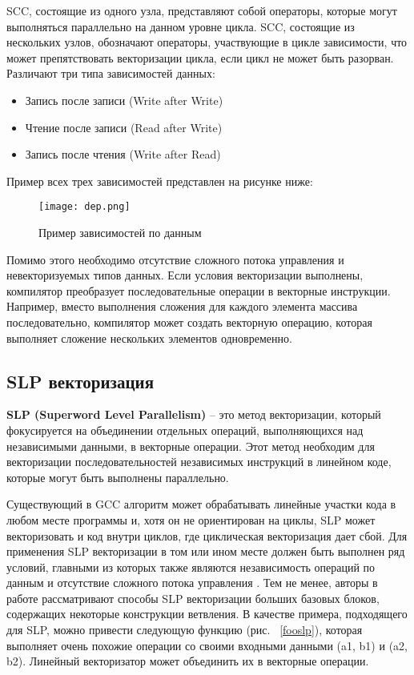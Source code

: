 SCC, состоящие из одного узла, представляют собой операторы, которые могут выполняться параллельно на данном уровне цикла. SCC, состоящие из нескольких узлов, обозначают операторы, участвующие в цикле зависимости, что может препятствовать векторизации цикла, если цикл не может быть разорван. Различают три типа зависимостей данных:

\begin{itemize}
    \item Запись после записи (Write after Write)
    \item Чтение после записи (Read after Write)
    \item Запись после чтения (Write after Read)
\end{itemize}

Пример всех трех зависимостей представлен на рисунке ниже:

\begin{figure}[!htb]
    \centering
    \texttt{[image: dep.png]}
    \caption{Пример зависимостей по данным}
\end{figure}

Помимо этого необходимо отсутствие сложного потока управления и невекторизуемых типов данных. Если условия векторизации выполнены, компилятор преобразует последовательные операции в векторные инструкции. Например, вместо выполнения сложения для каждого элемента массива последовательно, компилятор может создать векторную операцию, которая выполняет сложение нескольких элементов одновременно.

\subsection{SLP векторизация}
\textbf{SLP (Superword Level Parallelism)} – это метод векторизации, который фокусируется на объединении отдельных операций, выполняющихся над независимыми данными, в векторные операции. Этот метод необходим для векторизации последовательностей независимых инструкций в линейном коде, которые могут быть выполнены параллельно.

Существующий в GCC алгоритм может обрабатывать линейные участки кода в любом месте программы и, хотя он не ориентирован на циклы, SLP может векторизовать и код внутри циклов, где циклическая векторизация дает сбой. Для применения SLP векторизации в том или ином месте должен быть выполнен ряд условий, главными из которых также являются независимость операций по данным и отсутствие сложного потока управления \cite{chen2022all}. Тем не менее, авторы в работе \cite{shin2005superword} рассматривают способы SLP векторизации больших базовых блоков, содержащих некоторые конструкции ветвления. В качестве примера, подходящего для SLP, можно привести следующую функцию (рис. ~\ref{fooslp}), которая выполняет очень похожие операции со своими входными данными (a1, b1) и (a2, b2). Линейный векторизатор может объединить их в векторные операции.

